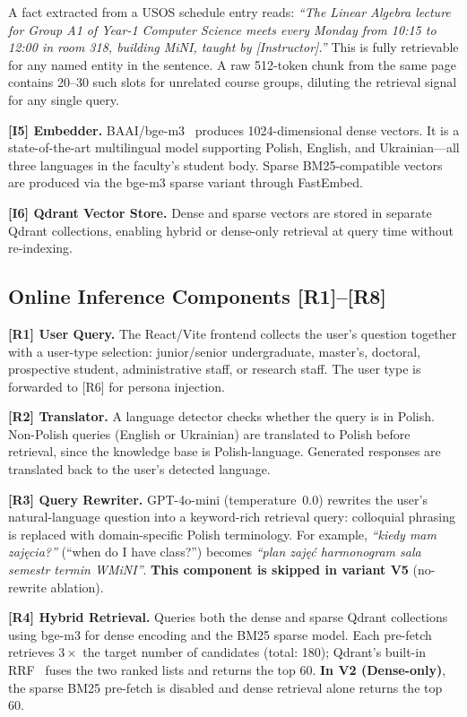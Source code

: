 \documentclass[sigconf,natbib=true]{acmart}
\begin{document}
A fact extracted from a USOS schedule entry reads: \textit{``The Linear Algebra lecture for Group A1 of Year-1 Computer Science meets every Monday from 10:15 to 12:00 in room 318, building MiNI, taught by [Instructor].''} This is fully retrievable for any named entity in the sentence. A raw 512-token chunk from the same page contains 20--30 such slots for unrelated course groups, diluting the retrieval signal for any single query.

\textbf{[I5] Embedder.}
BAAI/bge-m3~\cite{xiao2024bge} produces 1024-dimensional dense vectors.
It is a state-of-the-art multilingual model supporting Polish, English, and Ukrainian---all three languages in the faculty's student body.
Sparse BM25-compatible vectors are produced via the bge-m3 sparse variant through FastEmbed.

\textbf{[I6] Qdrant Vector Store.}
Dense and sparse vectors are stored in separate Qdrant collections, enabling hybrid or dense-only retrieval at query time without re-indexing.

\subsection{Online Inference Components [R1]--[R8]}

\textbf{[R1] User Query.}
The React/Vite frontend collects the user's question together with a user-type selection: junior/senior undergraduate, master's, doctoral, prospective student, administrative staff, or research staff. The user type is forwarded to [R6] for persona injection.

\textbf{[R2] Translator.}
A language detector checks whether the query is in Polish. Non-Polish queries (English or Ukrainian) are translated to Polish before retrieval, since the knowledge base is Polish-language. Generated responses are translated back to the user's detected language.

\textbf{[R3] Query Rewriter.}
GPT-4o-mini (temperature~0.0) rewrites the user's natural-language question into a keyword-rich retrieval query: colloquial phrasing is replaced with domain-specific Polish terminology.
For example, \textit{``kiedy mam zajęcia?''} (``when do I have class?'') becomes \textit{``plan zajęć harmonogram sala semestr termin WMiNI''}.
\textbf{This component is skipped in variant V5} (no-rewrite ablation).

\textbf{[R4] Hybrid Retrieval.}
Queries both the dense and sparse Qdrant collections using bge-m3 for dense encoding and the BM25 sparse model.
Each pre-fetch retrieves $3\times$ the target number of candidates (total: 180); Qdrant's built-in RRF~\cite{cormack2009rrf} fuses the two ranked lists and returns the top 60.
\textbf{In V2 (Dense-only)}, the sparse BM25 pre-fetch is disabled and dense retrieval alone returns the top 60.
\end{document}
